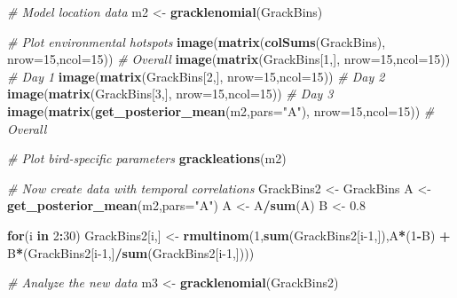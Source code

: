 \documentclass[
]{article}
\newenvironment{Shaded}{\begin{snugshade}}{\end{snugshade}}
\newcommand{\CommentTok}[1]{\textcolor[rgb]{0.56,0.35,0.01}{\textit{#1}}}
\newcommand{\ControlFlowTok}[1]{\textcolor[rgb]{0.13,0.29,0.53}{\textbf{#1}}}
\newcommand{\DataTypeTok}[1]{\textcolor[rgb]{0.13,0.29,0.53}{#1}}
\newcommand{\DecValTok}[1]{\textcolor[rgb]{0.00,0.00,0.81}{#1}}
\newcommand{\FloatTok}[1]{\textcolor[rgb]{0.00,0.00,0.81}{#1}}
\newcommand{\KeywordTok}[1]{\textcolor[rgb]{0.13,0.29,0.53}{\textbf{#1}}}
\newcommand{\NormalTok}[1]{#1}
\newcommand{\OperatorTok}[1]{\textcolor[rgb]{0.81,0.36,0.00}{\textbf{#1}}}
\newcommand{\StringTok}[1]{\textcolor[rgb]{0.31,0.60,0.02}{#1}}
\begin{document}
\begin{Shaded}
\begin{Highlighting}[]
\CommentTok{# Model location data}
\NormalTok{m2 <-}\StringTok{ }\KeywordTok{gracklenomial}\NormalTok{(GrackBins)}
 
\CommentTok{# Plot environmental hotspots}
\KeywordTok{image}\NormalTok{(}\KeywordTok{matrix}\NormalTok{(}\KeywordTok{colSums}\NormalTok{(GrackBins), }\DataTypeTok{nrow=}\DecValTok{15}\NormalTok{,}\DataTypeTok{ncol=}\DecValTok{15}\NormalTok{)) }\CommentTok{# Overall}
\KeywordTok{image}\NormalTok{(}\KeywordTok{matrix}\NormalTok{(GrackBins[}\DecValTok{1}\NormalTok{,], }\DataTypeTok{nrow=}\DecValTok{15}\NormalTok{,}\DataTypeTok{ncol=}\DecValTok{15}\NormalTok{)) }\CommentTok{# Day 1}
\KeywordTok{image}\NormalTok{(}\KeywordTok{matrix}\NormalTok{(GrackBins[}\DecValTok{2}\NormalTok{,], }\DataTypeTok{nrow=}\DecValTok{15}\NormalTok{,}\DataTypeTok{ncol=}\DecValTok{15}\NormalTok{)) }\CommentTok{# Day 2}
\KeywordTok{image}\NormalTok{(}\KeywordTok{matrix}\NormalTok{(GrackBins[}\DecValTok{3}\NormalTok{,], }\DataTypeTok{nrow=}\DecValTok{15}\NormalTok{,}\DataTypeTok{ncol=}\DecValTok{15}\NormalTok{)) }\CommentTok{# Day 3}
\KeywordTok{image}\NormalTok{(}\KeywordTok{matrix}\NormalTok{(}\KeywordTok{get_posterior_mean}\NormalTok{(m2,}\DataTypeTok{pars=}\StringTok{"A"}\NormalTok{), }\DataTypeTok{nrow=}\DecValTok{15}\NormalTok{,}\DataTypeTok{ncol=}\DecValTok{15}\NormalTok{)) }\CommentTok{# Overall}

\CommentTok{# Plot bird-specific parameters}
\KeywordTok{grackleations}\NormalTok{(m2)}

\CommentTok{# Now create data with temporal correlations}
\NormalTok{GrackBins2 <-}\StringTok{ }\NormalTok{GrackBins}
\NormalTok{A <-}\StringTok{ }\KeywordTok{get_posterior_mean}\NormalTok{(m2,}\DataTypeTok{pars=}\StringTok{"A"}\NormalTok{)}
\NormalTok{A <-}\StringTok{ }\NormalTok{A}\OperatorTok{/}\KeywordTok{sum}\NormalTok{(A)}
\NormalTok{B <-}\StringTok{ }\FloatTok{0.8}

\ControlFlowTok{for}\NormalTok{(i }\ControlFlowTok{in} \DecValTok{2}\OperatorTok{:}\DecValTok{30}\NormalTok{)}
\NormalTok{GrackBins2[i,] <-}\StringTok{ }\KeywordTok{rmultinom}\NormalTok{(}\DecValTok{1}\NormalTok{,}\KeywordTok{sum}\NormalTok{(GrackBins2[i}\DecValTok{-1}\NormalTok{,]),A}\OperatorTok{*}\NormalTok{(}\DecValTok{1}\OperatorTok{-}\NormalTok{B) }\OperatorTok{+}\StringTok{ }\NormalTok{B}\OperatorTok{*}\NormalTok{(GrackBins2[i}\DecValTok{-1}\NormalTok{,]}\OperatorTok{/}\KeywordTok{sum}\NormalTok{(GrackBins2[i}\DecValTok{-1}\NormalTok{,])))}

\CommentTok{# Analyze the new data}
\NormalTok{m3 <-}\StringTok{ }\KeywordTok{gracklenomial}\NormalTok{(GrackBins2)}


\end{Highlighting}
\end{Shaded}
\end{document}
